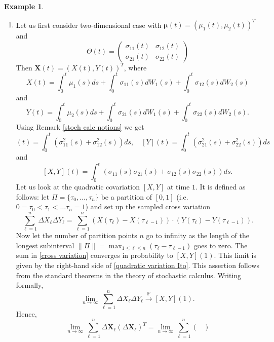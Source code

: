 \documentclass[a4paper,11pt]{article}
\theoremstyle{plain}
\theoremstyle{definition}
\newtheorem{exmp}[thm]{Example}
\begin{document}
	\begin{exmp} \label{quad var} \
		\begin{enumerate}
			\item 
			Let us first consider two-dimensional case with $\boldsymbol{\mu}(t) = (\mu_1(t), \mu_2(t))^T$ and
			\[\Theta(t) = \begin{pmatrix}
			\sigma_{11}(t) & \sigma_{12}(t) \\
			\sigma_{21}(t) & \sigma_{22}(t)
			\end{pmatrix} \]
			Then $\mathbf{X}(t) = (X(t), Y(t))^T$, where 
			\[X(t) = \int_0^t\mu_1(s) ds + \int_0^t\sigma_{11}(s) dW_1(s) + \int_0^t\sigma_{12}(s) dW_2(s)\] 
			and
			\[Y(t) = \int_0^t\mu_2(s) ds + \int_0^t\sigma_{21}(s) dW_1(s) + \int_0^t\sigma_{22}(s) dW_2(s).\]
			Using Remark \ref{stoch calc notions} we get
			\begin{equation}
			[X](t) = \int_{0}^{t}(\sigma_{11}^2(s) +\sigma_{12}^2(s)) ds, \quad  [Y](t) = \int_{0}^{t}(\sigma_{21}^2(s) +\sigma_{22}^2(s)) ds
			\end{equation}
			and
			\begin{equation} \label{quadratic variation Ito}
			[X, Y](t) = \int_{0}^{t}(\sigma_{11}(s)\sigma_{21}(s) + \sigma_{12}(s)\sigma_{22}(s)) ds. 
			\end{equation}
			Let us look at the quadratic covariation $[X, Y]$ at time $1$. It is defined as follows: let $\Pi = \{ \tau_0, \dots, \tau_n \}$ be a partition of $[0, 1]$ (i.e. $0 = \tau_0 < \tau_1 < \dots \tau_n = 1$) and set up the sampled cross variation
			\begin{equation} \label{cross variation}
			\sum_{\ell = 1}^{n} \Delta X_\ell \Delta Y_\ell = \sum_{\ell = 1}^{n} (X(\tau_\ell) - X(\tau_{\ell-1})) \cdot (Y(\tau_\ell) - Y(\tau_{\ell-1})).
			\end{equation}
			Now let the number of partition points $n$ go to infinity as the length of the longest subinterval $\| \Pi \| = \max_{1 \leq \ell \leq n}(\tau_{\ell} - \tau_{\ell-1}) $ goes to zero. The sum in \eqref{cross variation} converges in probability to $[X, Y](1)$. This limit is given by the right-hand side of \eqref{quadratic variation Ito}. This assertion follows from the standard theorems in the theory of stochastic calculus. Writing formally,
			\[  \lim_{n \rightarrow \infty} \sum_{\ell = 1}^{n} \Delta X_\ell \Delta Y_\ell \xrightarrow{\mathbb{P}} [X, Y](1). \]
			Hence,
			\[
			\lim_{n \rightarrow \infty} \sum_{\ell=1}^{n}\Delta \mathbf{X}_\ell(\Delta \mathbf{X}_\ell)^T
			= \lim_{n \rightarrow \infty} \sum_{\ell=1}^{n}\begin{pmatrix}

\end{pmatrix}\]
\end{enumerate}
\end{exmp}
\end{document}
